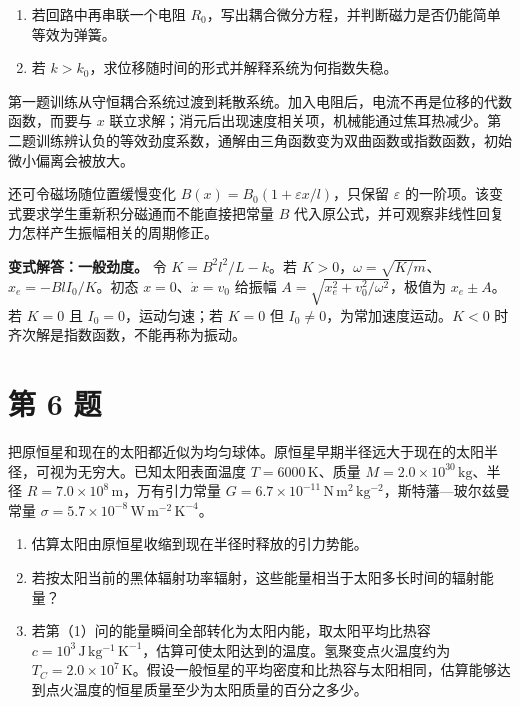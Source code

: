 \documentclass[12pt,a4paper,UTF8]{ctexart}
\newcommand{\tightlist}{\setlength{\itemsep}{0pt}\setlength{\parskip}{0pt}}
\begin{document}
\begin{enumerate}
\def\labelenumi{\arabic{enumi}.}
\tightlist
\item
  若回路中再串联一个电阻
  \(R_0\)，写出耦合微分方程，并判断磁力是否仍能简单等效为弹簧。
\item
  若 \(k>k_0\)，求位移随时间的形式并解释系统为何指数失稳。
\end{enumerate}

第一题训练从守恒耦合系统过渡到耗散系统。加入电阻后，电流不再是位移的代数函数，而要与
\(x\)
联立求解；消元后出现速度相关项，机械能通过焦耳热减少。第二题训练辨认负的等效劲度系数，通解由三角函数变为双曲函数或指数函数，初始微小偏离会被放大。

还可令磁场随位置缓慢变化 \(B(x)=B_0(1+\varepsilon x/l)\)，只保留
\(\varepsilon\) 的一阶项。该变式要求学生重新积分磁通而不能直接把常量
\(B\) 代入原公式，并可观察非线性回复力怎样产生振幅相关的周期修正。

\textbf{变式解答：一般劲度。} 令 \(K=B^2l^2/L-k\)。若
\(K>0\)，\(\omega=\sqrt{K/m}\)、\(x_e=-BlI_0/K\)。初态
\(x=0\)、\(\dot x=v_0\) 给振幅 \(A=\sqrt{x_e^2+v_0^2/\omega^2}\)，极值为
\(x_e\pm A\)。若 \(K=0\) 且 \(I_0=0\)，运动匀速；若 \(K=0\) 但
\(I_0\ne0\)，为常加速度运动。\(K<0\)
时齐次解是指数函数，不能再称为振动。

\newpage

\section{第 6 题}\label{ux7b2c-6-ux9898}

把原恒星和现在的太阳都近似为均匀球体。原恒星早期半径远大于现在的太阳半径，可视为无穷大。已知太阳表面温度
\(T=6000\,\mathrm K\)、质量 \(M=2.0\times10^{30}\,\mathrm{kg}\)、半径
\(R=7.0\times10^8\,\mathrm m\)，万有引力常量
\(G=6.7\times10^{-11}\,\mathrm{N\,m^2\,kg^{-2}}\)，斯特藩---玻尔兹曼常量
\(\sigma=5.7\times10^{-8}\,\mathrm{W\,m^{-2}\,K^{-4}}\)。

\begin{enumerate}
\def\labelenumi{\arabic{enumi}.}
\tightlist
\item
  估算太阳由原恒星收缩到现在半径时释放的引力势能。
\item
  若按太阳当前的黑体辐射功率辐射，这些能量相当于太阳多长时间的辐射能量？
\item
  若第（1）问的能量瞬间全部转化为太阳内能，取太阳平均比热容
  \(c=10^3\,\mathrm{J\,kg^{-1}\,K^{-1}}\)，估算可使太阳达到的温度。氢聚变点火温度约为
  \(T_C=2.0\times10^7\,\mathrm K\)。假设一般恒星的平均密度和比热容与太阳相同，估算能够达到点火温度的恒星质量至少为太阳质量的百分之多少。
\end{enumerate}
\end{document}
